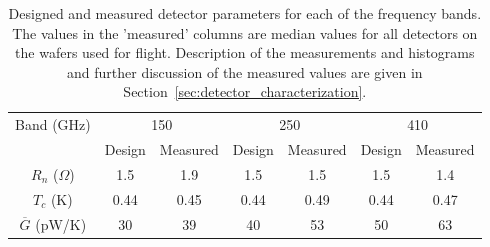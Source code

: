 \begin{table}[ht!]
\centering
\begin{tabular}{| c | c c | c c | c c |}\hline
\multicolumn{1}{|c}{Band (GHz)}   &  \multicolumn{2}{|c}{150}   & \multicolumn{2}{|c}{250}   & \multicolumn{2}{|c|}{410}  \\%
                                     & Design & Measured & Design & Measured & Design & Measured  \\ \hline
$R_{n}$ ($\Omega$)            & 1.5  & 1.9  & 1.5  & 1.5  & 1.5  & 1.4  \\
$T_{c}$ (K)                        & 0.44 & 0.45 & 0.44 & 0.49 & 0.44 & 0.47  \\
$\overline{G}$ (pW/K)       & 30   & 39 & 40   & 53 & 50   & 63  \\ \hline
\end{tabular}
\caption{Designed and measured detector parameters for each of the frequency
bands.  The values in the 'measured' columns are median values for 
all detectors on the wafers used for flight.  Description of the measurements and histograms and further discussion 
of the measured values are given in Section~\ref{sec:detector_characterization}.
\label{tab:Design_Params} }
\end{table}


